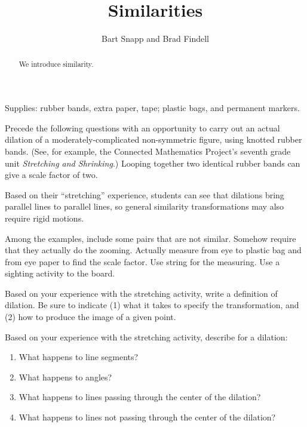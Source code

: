 \documentclass[nooutcomes]{ximera}
\title{Similarities}
\author{Bart Snapp and Brad Findell}
\begin{document}
\begin{abstract}
  We introduce similarity.
\end{abstract}
\maketitle

\begin{teachingnote}
Supplies:  rubber bands, extra paper, tape; plastic bags, and permanent markers.   

Precede the following questions with an opportunity to carry out an actual dilation of a moderately-complicated non-symmetric figure, using knotted rubber bands.  (See, for example, the Connected Mathematics Project's seventh grade unit \emph{Stretching and Shrinking}.)  Looping together two identical rubber bands can give a scale factor of two.

Based on their ``stretching'' experience, students can see that dilations bring parallel lines to parallel lines, so general similarity transformations may also require rigid motions.  

Among the examples, include some pairs that are not similar.  Somehow require that they actually do the zooming.  Actually measure from eye to plastic bag and from eye paper to find the scale factor.  Use string for the measuring.  Use a sighting activity to the board.
\end{teachingnote}

\begin{problem}
Based on your experience with the stretching activity, write a definition of dilation.  Be sure to indicate (1) what it takes to specify the transformation, and (2) how to produce the image of a given point.  
\vspace{0.6in}
\end{problem}

\begin{problem}
Based on your experience with the stretching activity, describe for a dilation: 
\begin{enumerate}
\item What happens to line segments? 
\vspace{0.2in}
\item What happens to angles?  
\vspace{0.2in}
\item What happens to lines passing through the center of the dilation?
\vspace{0.2in}
\item What happens to lines not passing through the center of the dilation?
\vspace{0.2in}
\end{enumerate}
\end{problem}
\end{document}

